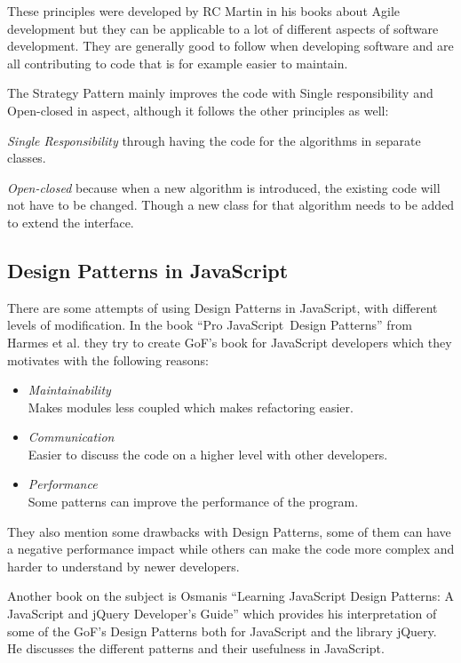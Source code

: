 \documentclass[conference, a4paper]{IEEEtran}
\begin{document}
These principles were developed by RC Martin in his books about Agile development but they can be applicable to a lot of different aspects of software development. They are generally good to follow when developing software and are all contributing to code that is for example easier to maintain.~\cite{bibitem:Bob}

The Strategy Pattern mainly improves the code with Single responsibility and Open-closed in aspect, although it follows the other principles as well:

\textit{Single Responsibility} through having the code for the algorithms in separate classes.

\textit{Open-closed} because when a new algorithm is introduced, the existing code will not have to be changed. Though a new class for that algorithm needs to be added to extend the interface.

\subsection{Design Patterns in JavaScript}
There are some attempts of using Design Patterns in JavaScript, with different levels of modification. In the book ``Pro JavaScript\texttrademark~Design Patterns'' from Harmes et al. they try to create GoF's book for JavaScript developers which they motivates with the following reasons:
\begin{itemize}
    \item \emph{Maintainability} \\
		Makes modules less coupled which makes refactoring easier.
    \item \emph{Communication} \\
		Easier to discuss the code on a higher level with other developers.
    \item \emph{Performance} \\
    Some patterns can improve the performance of the program.
\end{itemize}
They also mention some drawbacks with Design Patterns, some of them can have a negative performance impact while others can make the code more complex and harder to understand by newer developers.~\cite{bibitem:DiazHarmes}

Another book on the subject is Osmanis ``Learning JavaScript Design Patterns: A JavaScript and jQuery Developer's Guide'' which provides his interpretation of some of the GoF's Design Patterns both for JavaScript and the library jQuery. He discusses the different patterns and their usefulness in JavaScript.~\cite{bibitem:Osmani}
\end{document}
